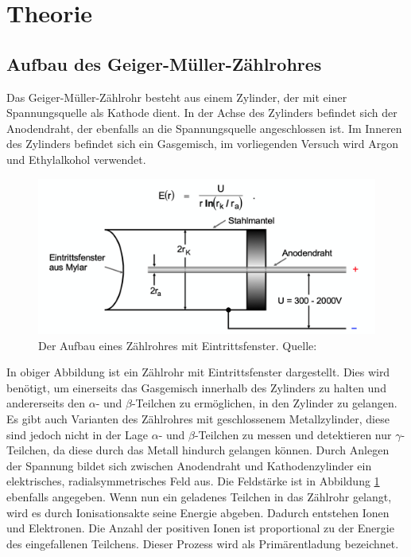 \section{Theorie}
  \subsection{Aufbau des Geiger-Müller-Zählrohres}
    Das Geiger-Müller-Zählrohr besteht aus einem Zylinder, der mit einer Spannungsquelle als
    Kathode dient. In der Achse des Zylinders befindet sich der Anodendraht, der ebenfalls an die
    Spannungsquelle angeschlossen ist. Im Inneren des Zylinders befindet sich ein Gasgemisch,
    im vorliegenden Versuch wird Argon und Ethylalkohol verwendet.
    \begin{figure}[H]
      \centering
        \includegraphics[scale=0.4]{content/AufbauGMZ.png}
        \caption{Der Aufbau eines Zählrohres mit Eintrittsfenster. Quelle:\cite{AP01}}
        \label{fig:aufbau1}
    \end{figure}
    \noindent
    In obiger Abbildung ist ein Zählrohr mit Eintrittsfenster dargestellt. Dies wird benötigt,
    um einerseits das Gasgemisch innerhalb des Zylinders zu halten und andererseits den
    $\alpha$- und $\beta$-Teilchen zu ermöglichen, in den Zylinder zu gelangen. Es gibt auch
    Varianten des Zählrohres mit geschlossenem Metallzylinder, diese sind jedoch nicht in der Lage
    $\alpha$- und $\beta$-Teilchen zu messen und detektieren nur $\gamma$-Teilchen, da diese durch das
    Metall hindurch gelangen können.
    Durch Anlegen der Spannung bildet sich zwischen Anodendraht und Kathodenzylinder ein elektrisches,
    radialsymmetrisches Feld aus. Die Feldstärke ist in Abbildung \ref{fig:aufbau1} ebenfalls
    angegeben. Wenn nun ein geladenes Teilchen in das Zählrohr gelangt, wird es durch Ionisationsakte
    seine Energie abgeben. Dadurch entstehen Ionen und Elektronen. Die Anzahl der positiven Ionen ist
    proportional zu der Energie des eingefallenen Teilchens. Dieser Prozess wird als Primärentladung
    bezeichnet.
